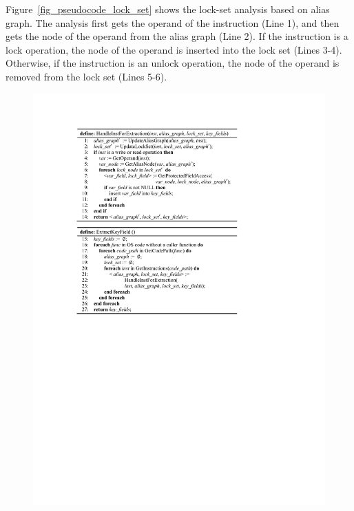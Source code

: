Figure~\ref{fig_pseudocode_lock_set} shows the lock-set analysis based on alias 
graph. The analysis first gets the operand of the instruction (Line 1), and 
then gets the node of the operand from the alias graph (Line 2). If the 
instruction is a lock operation, the node of the operand is inserted into the 
lock set (Lines 3-4). Otherwise, if the instruction is an unlock operation, the 
node of the operand is removed from the lock set (Lines 5-6).

\begin{figure}[htbp]
	\centering
	\includegraphics[width=1\linewidth]{figures/fig_pseudocode_field_extract.pdf}
	\label{fig_pseudocode_field_extract}
\end{figure}

